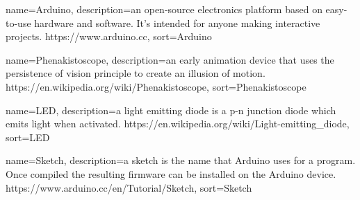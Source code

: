 %
{
  name={Arduino},
  description={an open-source electronics platform based on easy-to-use hardware and software. It's intended for anyone making interactive projects. https://www.arduino.cc},
  sort=Arduino
}
%

%
{
	name={Phenakistoscope},
	description={an early animation device that uses the persistence of vision principle to create an illusion of motion. https://en.wikipedia.org/wiki/Phenakistoscope},
	sort=Phenakistoscope
}
%

%
{
	name={LED},
	description={a light emitting diode is a p-n junction diode which emits light when activated. https://en.wikipedia.org/wiki/Light-emitting\_diode},
	sort=LED
}
%

%
{
	name={Sketch},
	description={a sketch is the name that Arduino uses for a program. Once compiled the resulting firmware can be installed on the Arduino device. https://www.arduino.cc/en/Tutorial/Sketch},
	sort=Sketch
}
%